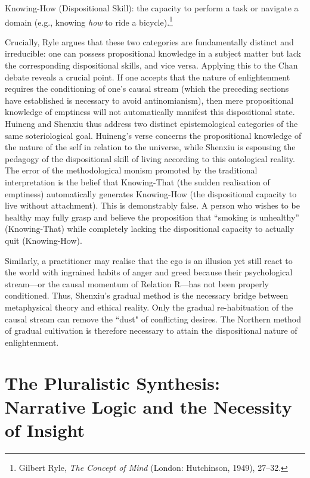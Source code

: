 \vspace{0.5em}
\noindent Knowing-How (Dispositional Skill): the capacity to perform a task or
navigate a domain (e.g., knowing \emph{how} to ride a
bicycle).\footnote{Gilbert Ryle, \emph{The Concept of Mind} (London:
  Hutchinson, 1949), 27--32.}

\vspace{0.5em}
\noindent Crucially, Ryle argues that these two categories are fundamentally
distinct and irreducible: one can possess propositional knowledge in a
subject matter but lack the corresponding dispositional skills, and vice
versa. Applying this to the Chan debate reveals a crucial point. If one
accepts that the nature of enlightenment requires the conditioning of
one's causal stream (which the preceding sections have established is
necessary to avoid antinomianism), then mere propositional knowledge of
emptiness will not automatically manifest this dispositional state.
Huineng and Shenxiu thus address two distinct epistemological categories
of the same soteriological goal. Huineng's verse concerns the
propositional knowledge of the nature of the self in relation to the
universe, while Shenxiu is espousing the pedagogy of the dispositional
skill of living according to this ontological reality. The error of the
methodological monism promoted by the traditional interpretation is the
belief that Knowing-That (the sudden realisation of emptiness)
automatically generates Knowing-How (the dispositional capacity to live
without attachment). This is demonstrably false. A person who wishes to
be healthy may fully grasp and believe the proposition that ``smoking is
unhealthy'' (Knowing-That) while completely lacking the dispositional
capacity to actually quit (Knowing-How).

Similarly, a practitioner may realise that the ego is an illusion yet
still react to the world with ingrained habits of anger and greed
because their psychological stream---or the causal momentum of Relation
R---has not been properly conditioned. Thus, Shenxiu's gradual method is
the necessary bridge between metaphysical theory and ethical reality.
Only the gradual re-habituation of the causal stream can remove the
``dust" of conflicting desires. The Northern method of gradual
cultivation is therefore necessary to attain the dispositional nature of
enlightenment.

\section{The Pluralistic Synthesis: Narrative Logic and the Necessity
  of Insight}

